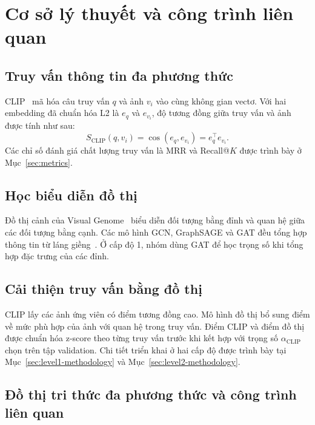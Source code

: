 \chapter{Cơ sở lý thuyết và công trình liên quan}
\label{chap:related-work}

\section{Truy vấn thông tin đa phương thức}
\label{sec:multimodal-retrieval}

CLIP~\cite{radford2021clip} mã hóa câu truy vấn $q$ và ảnh $v_i$ vào cùng không gian vectơ. Với hai embedding đã chuẩn hóa L2 là $e_q$ và $e_{v_i}$, độ tương đồng giữa truy vấn và ảnh được tính như sau:
\begin{equation}
  S_{\text{CLIP}}(q,v_i)=\cos(e_q,e_{v_i})=e_q^\top e_{v_i}.
  \label{eq:clip-similarity}
\end{equation}
Các chỉ số đánh giá chất lượng truy vấn là MRR và Recall@$K$ được trình bày ở Mục~\ref{sec:metrics}.

\section{Học biểu diễn đồ thị}
\label{sec:graph-representation-learning}

Đồ thị cảnh của Visual Genome~\cite{krishna2017visualgenome} biểu diễn đối tượng bằng đỉnh và quan hệ giữa các đối tượng bằng cạnh. Các mô hình GCN, GraphSAGE và GAT đều tổng hợp thông tin từ láng giềng~\cite{kipf2017gcn,hamilton2017graphsage,velickovic2018gat}. Ở cấp độ 1, nhóm dùng GAT để học trọng số khi tổng hợp đặc trưng của các đỉnh.

\section{Cải thiện truy vấn bằng đồ thị}
\label{sec:graph-enhanced-retrieval}

CLIP lấy các ảnh ứng viên có điểm tương đồng cao. Mô hình đồ thị bổ sung điểm về mức phù hợp của ảnh với quan hệ trong truy vấn. Điểm CLIP và điểm đồ thị được chuẩn hóa z-score theo từng truy vấn trước khi kết hợp với trọng số $\alpha_{\mathrm{CLIP}}$ chọn trên tập validation. Chi tiết triển khai ở hai cấp độ được trình bày tại Mục~\ref{sec:level1-methodology} và Mục~\ref{sec:level2-methodology}.

\section{Đồ thị tri thức đa phương thức và công trình liên quan}
\label{sec:advanced-mmkg-methods}

